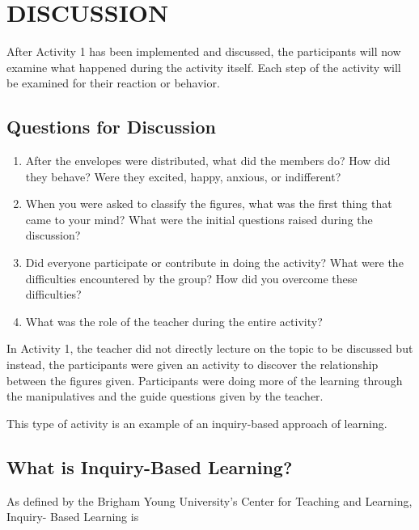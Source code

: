 \section*{DISCUSSION}
After Activity 1 has been implemented and discussed, the participants will now examine what
happened during the activity itself. Each step of the activity will be examined for their reaction
or behavior.
\subsection*{Questions for Discussion}
\begin{enumerate}
\item After the envelopes were distributed, what did the members do? How did they behave?
Were they excited, happy, anxious, or indifferent?
\item When you were asked to classify the figures, what was the first thing that came to your
mind? What were the initial questions raised during the discussion?
\item Did everyone participate or contribute in doing the activity? What were the difficulties
encountered by the group? How did you overcome these difficulties?
\item What was the role of the teacher during the entire activity?
\end{enumerate}
In Activity 1, the teacher did not directly lecture on the topic to be discussed but
instead, the participants were given an activity to discover the relationship between the
figures given. Participants were doing more of the learning through the manipulatives and
the guide questions given by the teacher.

This type of activity is an example of an inquiry-based approach of learning.

\subsection*{What is Inquiry-Based Learning?}

As defined by the Brigham Young University’s Center for Teaching and Learning, Inquiry-
Based Learning is

